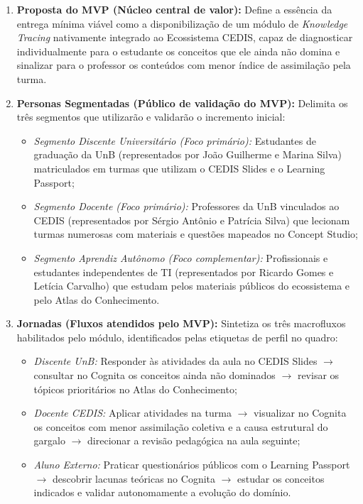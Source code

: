 \begin{enumerate}
    \item \textbf{Proposta do MVP (Núcleo central de valor):} Define a essência da entrega mínima viável como a disponibilização de um módulo de \textit{Knowledge Tracing} nativamente integrado ao Ecossistema CEDIS, capaz de diagnosticar individualmente para o estudante os conceitos que ele ainda não domina e sinalizar para o professor os conteúdos com menor índice de assimilação pela turma.

    \item \textbf{Personas Segmentadas (Público de validação do MVP):} Delimita os três segmentos que utilizarão e validarão o incremento inicial:
    \begin{itemize}
        \item \textit{Segmento Discente Universitário (Foco primário):} Estudantes de graduação da UnB (representados por João Guilherme e Marina Silva) matriculados em turmas que utilizam o CEDIS Slides e o Learning Passport;
        \item \textit{Segmento Docente (Foco primário):} Professores da UnB vinculados ao CEDIS (representados por Sérgio Antônio e Patrícia Silva) que lecionam turmas numerosas com materiais e questões mapeados no Concept Studio;
        \item \textit{Segmento Aprendiz Autônomo (Foco complementar):} Profissionais e estudantes independentes de TI (representados por Ricardo Gomes e Letícia Carvalho) que estudam pelos materiais públicos do ecossistema e pelo Atlas do Conhecimento.
    \end{itemize}

    \item \textbf{Jornadas (Fluxos atendidos pelo MVP):} Sintetiza os três macrofluxos habilitados pelo módulo, identificados pelas etiquetas de perfil no quadro:
    \begin{itemize}
        \item \textit{Discente UnB:} Responder às atividades da aula no CEDIS Slides $\rightarrow$ consultar no Cognita os conceitos ainda não dominados $\rightarrow$ revisar os tópicos prioritários no Atlas do Conhecimento;
        \item \textit{Docente CEDIS:} Aplicar atividades na turma $\rightarrow$ visualizar no Cognita os conceitos com menor assimilação coletiva e a causa estrutural do gargalo $\rightarrow$ direcionar a revisão pedagógica na aula seguinte;
        \item \textit{Aluno Externo:} Praticar questionários públicos com o Learning Passport $\rightarrow$ descobrir lacunas teóricas no Cognita $\rightarrow$ estudar os conceitos indicados e validar autonomamente a evolução do domínio.
    \end{itemize}


\end{enumerate}
